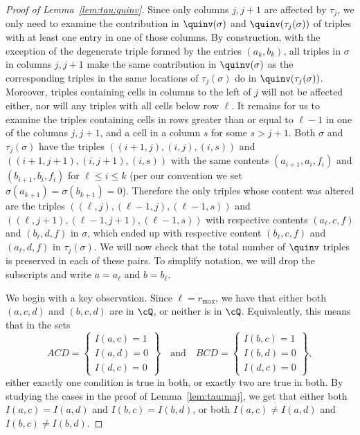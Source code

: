 \begin{proof}[Proof of Lemma~\ref{lem:tau:quinv}]
Since only columns $j,j+1$ are affected by $\tau_j$, we only need to examine the contribution in $\quinv(\sigma)$ and $\quinv(\tau_j(\sigma))$ of triples with at least one entry in one of those columns. By construction, with the exception of the degenerate triple formed by the entries $(a_k,b_k)$, all triples in $\sigma$ in columns $j,j+1$ make the same contribution in $\quinv(\sigma)$ as the corresponding triples in the same locations of $\tau_j(\sigma)$ do in $\quinv(\tau_j(\sigma))$. Moreover, triples containing cells in columns to the left of $j$ will not be affected either, nor will any triples with all cells below row $\ell$. It remains for us to examine the triples containing cells in rows greater than or equal to $\ell-1$ in one of the columns $j,j+1$, and a cell in a column $s$ for some $s>j+1$. Both $\sigma$ and $\tau_j(\sigma)$ have the triples $((i+1,j),(i,j),(i,s))$ and $((i+1,j+1),(i,j+1),(i,s))$ with the same contents $(a_{i+1},a_i,f_i)$ and $(b_{i+1},b_i,f_i)$ for $\ell\leq i \leq k$ (per our convention we set $\sigma(a_{k+1})=\sigma(b_{k+1})=0$). Therefore the only triples whose content was altered are the triples $((\ell,j),(\ell-1,j),(\ell-1,s))$ and $((\ell,j+1),(\ell-1,j+1),(\ell-1,s))$ with respective contents $(a_{\ell},c,f)$ and $(b_{\ell},d,f)$ in $\sigma$, which ended up with respective content $(b_{\ell},c,f)$ and $(a_{\ell},d,f)$ in $\tau_j(\sigma)$. We will now check that the total number of $\quinv$ triples is preserved in each of these pairs. To simplify notation, we will drop the subscripts and write $a=a_{\ell}$ and $b=b_{\ell}$.


We begin with a key observation. Since $\ell=r_{\max}$, we have that either both $(a,c,d)$ and $(b,c,d)$ are in $\cQ$, or neither is in $\cQ$. Equivalently, this means that in the sets
\[ 
ACD = \left\{\begin{matrix}I(a,c)=1\\I(a,d)=0\\I(d,c)=0 \end{matrix} \right\} 
\quad \mbox{and} \quad 
BCD = \left\{\begin{matrix}I(b,c)=1\\I(b,d)=0\\I(d,c)=0 \end{matrix} \right\},
\]
either exactly one condition is true in both, or exactly two are true in both. By studying the cases in the proof of Lemma~\ref{lem:tau:maj}, we get that either both $I(a,c)=I(a,d)$ and $I(b,c)=I(b,d)$, or both $I(a,c)\neq I(a,d)$ and $I(b,c)\neq I(b,d)$. 


\end{proof}
